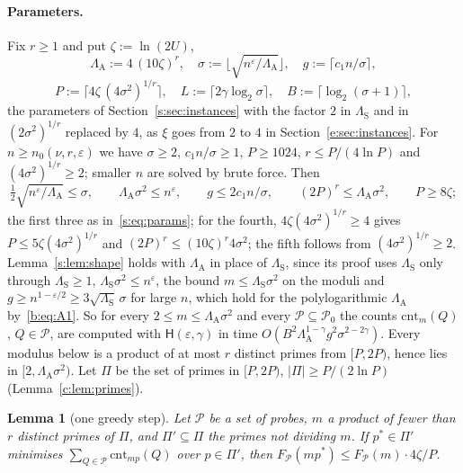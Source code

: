 \documentclass[11pt]{article}
\newtheorem{lemma}[theorem]{Lemma}
\theoremstyle{definition}
\theoremstyle{remark}
\newcommand{\cnt}{\mathrm{cnt}}
\newcommand{\Pq}{\mathcal{P}}
\newcommand{\Hyp}{\mathsf{H}}
\begin{document}
\paragraph{Parameters.} Fix $r\ge1$ and put $\zeta:=\ln(2U)$,
\[
\Lambda_{\mathrm A}:=4\,(10\zeta)^r,\quad \sigma:=\Big\lfloor\sqrt{n^\varepsilon/\Lambda_{\mathrm A}}\Big\rfloor,\quad g:=\lceil c_1n/\sigma\rceil,
\]
\[
P:=\big\lceil4\zeta\,(4\sigma^2)^{1/r}\big\rceil,\quad L:=\lceil2\gamma\log_2\sigma\rceil,\quad B:=\lceil\log_2(\sigma+1)\rceil,
\]
the parameters of Section~\ref{s:sec:instances} with the factor $2$ in $\Lambda_{\mathrm S}$ and in $(2\sigma^2)^{1/r}$ replaced by $4$, as $\xi$ goes from $2$ to $4$ in Section~\ref{e:sec:instances}. For $n\ge n_0(\nu,r,\varepsilon)$ we have $\sigma\ge2$, $c_1n/\sigma\ge1$, $P\ge1024$, $r\le P/(4\ln P)$ and $(4\sigma^2)^{1/r}\ge2$; smaller $n$ are solved by brute force. Then
\begin{equation}\label{b:eq:A1}
\tfrac12\sqrt{n^\varepsilon/\Lambda_{\mathrm A}}\le\sigma,\qquad \Lambda_{\mathrm A}\sigma^2\le n^\varepsilon,\qquad g\le2c_1n/\sigma,\qquad (2P)^r\le\Lambda_{\mathrm A}\sigma^2,\qquad P\ge8\zeta;
\end{equation}
the first three as in~\eqref{s:eq:params}; for the fourth, $4\zeta(4\sigma^2)^{1/r}\ge4$ gives $P\le5\zeta(4\sigma^2)^{1/r}$ and $(2P)^r\le(10\zeta)^r4\sigma^2$; the fifth follows from $(4\sigma^2)^{1/r}\ge2$. Lemma~\ref{s:lem:shape} holds with $\Lambda_{\mathrm A}$ in place of $\Lambda_{\mathrm S}$, since its proof uses $\Lambda_{\mathrm S}$ only through $\Lambda_{\mathrm S}\ge1$, $\Lambda_{\mathrm S}\sigma^2\le n^\varepsilon$, the bound $m\le\Lambda_{\mathrm S}\sigma^2$ on the moduli and $g\ge n^{1-\varepsilon/2}\ge3\sqrt{\Lambda_{\mathrm S}}\,\sigma$ for large $n$, which hold for the polylogarithmic $\Lambda_{\mathrm A}$ by~\eqref{b:eq:A1}. So for every $2\le m\le\Lambda_{\mathrm A}\sigma^2$ and every $\Pq\subseteq\Pq_0$ the counts $\cnt_m(Q)$, $Q\in\Pq$, are computed with $\Hyp(\varepsilon,\gamma)$ in time $O(B^2\Lambda_{\mathrm A}^{1-\gamma}g^2\sigma^{2-2\gamma})$. Every modulus below is a product of at most $r$ distinct primes from $[P,2P)$, hence lies in $[2,\Lambda_{\mathrm A}\sigma^2)$. Let $\Pi$ be the set of primes in $[P,2P)$, $|\Pi|\ge P/(2\ln P)$ (Lemma~\ref{c:lem:primes}).

\begin{lemma}[one greedy step]\label{b:lem:stepA}
Let $\Pq$ be a set of probes, $m$ a product of fewer than $r$ distinct primes of $\Pi$, and $\Pi'\subseteq\Pi$ the primes not dividing $m$. If $p^*\in\Pi'$ minimises $\sum_{Q\in\Pq}\cnt_{mp}(Q)$ over $p\in\Pi'$, then $F_{\Pq}(mp^*)\le F_{\Pq}(m)\cdot4\zeta/P$.
\end{lemma}
\end{document}
